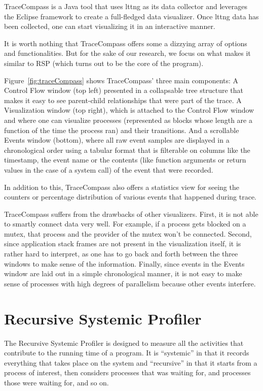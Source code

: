 \documentclass[10pt]{article}
\begin{document}
TraceCompass is a Java tool that uses lttng as its data collector and leverages
the Eclipse framework to create a full-fledged data visualizer. Once lttng data
has been collected, one can start visualizing it in an interactive manner.

It is worth nothing that TraceCompass offers some a dizzying array of options
and functionalities. But for the sake of our research, we focus on what makes
it similar to RSP (which turns out to be the core of the program).

Figure~\ref{fig:traceCompass} shows TraceCompass' three main components: A
Control Flow window (top left) presented in a collapsable tree structure that
makes it easy to see parent-child relationships that were part of the trace. A
Visualization window (top right), which is attached to the Control Flow window
and where one can visualize processes (represented as blocks whose length are a
function of the time the process ran) and their transitions. And a scrollable
Events window (bottom), where all raw event samples are displayed in a
chronological order using a tabular format that is filterable on columns like
the timestamp, the event name or the contents (like function arguments or
return values in the case of a system call) of the event that were recorded.

In addition to this, TraceCompass also offers a statistics view for seeing the
counters or percentage distribution of various events that happened during trace.

TraceCompass suffers from the drawbacks of other visualizers. First, it is not
able to smartly connect data very well. For example, if a process gets blocked
on a mutex, that process and the provider of the mutex won’t be connected.
Second, since application stack frames are not present in the visualization
itself, it is rather hard to interpret, as one has to go back and forth between
the three windows to make sense of the information. Finally, since events in
the Events window are laid out in a simple chronological manner, it is not easy
to make sense of processes with high degrees of parallelism because other
events interfere.

\section{Recursive Systemic Profiler}

The Recursive Systemic Profiler is designed to measure all the activities that contribute to the running time of a program.  It is ``systemic'' in that it records everything that takes place on the system and ``recursive'' in that it starts from a process of interest, then considers processes that was waiting for, and processes those were waiting for, and so on.
\end{document}
